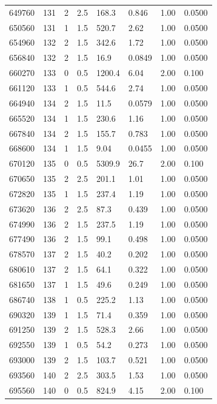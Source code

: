 \documentclass[preview]{standalone}
\begin{document}
{{{{{{{{{{\begin{tabular}{L{1.2cm}C{1.2cm} C{0.3cm}C{0.5cm} C{1.4cm}C{1.4cm} C{1.4cm}C{1.4cm}}
  649760  &   131  & 2     & 2.5 &  168.3  & 0.846  & 1.00 &  0.0500   \\ 
  650560  &   131  & 1     & 1.5 &  520.7  & 2.62  & 1.00 &  0.0500   \\ 
  654960  &   132  & 2     & 1.5 &  342.6  & 1.72  & 1.00 &  0.0500   \\ 
  656840  &   132  & 2     & 1.5 &  16.9  & 0.0849  & 1.00 &  0.0500   \\ 
  660270  &   133  & 0     & 0.5 &  1200.4  & 6.04  & 2.00 &  0.100   \\ 
  661120  &   133  & 1     & 0.5 &  544.6  & 2.74  & 1.00 &  0.0500   \\ 
  664940  &   134  & 2     & 1.5 &  11.5  & 0.0579  & 1.00 &  0.0500   \\ 
  665520  &   134  & 1     & 1.5 &  230.6  & 1.16  & 1.00 &  0.0500   \\ 
  667840  &   134  & 2     & 1.5 &  155.7  & 0.783  & 1.00 &  0.0500   \\ 
  668600  &   134  & 1     & 1.5 &  9.04  & 0.0455  & 1.00 &  0.0500   \\ 
  670120  &   135  & 0     & 0.5 &  5309.9  & 26.7  & 2.00 &  0.100   \\ 
  670650  &   135  & 2     & 2.5 &  201.1  & 1.01  & 1.00 &  0.0500   \\ 
  672820  &   135  & 1     & 1.5 &  237.4  & 1.19  & 1.00 &  0.0500   \\ 
  673620  &   136  & 2     & 2.5 &  87.3  & 0.439  & 1.00 &  0.0500   \\ 
  674990  &   136  & 2     & 1.5 &  237.5  & 1.19  & 1.00 &  0.0500   \\ 
  677490  &   136  & 2     & 1.5 &  99.1  & 0.498  & 1.00 &  0.0500   \\ 
  678570  &   137  & 2     & 1.5 &  40.2  & 0.202  & 1.00 &  0.0500   \\ 
  680610  &   137  & 2     & 1.5 &  64.1  & 0.322  & 1.00 &  0.0500   \\ 
  681650  &   137  & 1     & 1.5 &  49.6  & 0.249  & 1.00 &  0.0500   \\ 
  686740  &   138  & 1     & 0.5 &  225.2  & 1.13  & 1.00 &  0.0500   \\ 
  690320  &   139  & 1     & 1.5 &  71.4  & 0.359  & 1.00 &  0.0500   \\ 
  691250  &   139  & 2     & 1.5 &  528.3  & 2.66  & 1.00 &  0.0500   \\ 
  692550  &   139  & 1     & 0.5 &  54.2  & 0.273  & 1.00 &  0.0500   \\ 
  693000  &   139  & 2     & 1.5 &  103.7  & 0.521  & 1.00 &  0.0500   \\ 
  693560  &   140  & 2     & 2.5 &  303.5  & 1.53  & 1.00 &  0.0500   \\ 
  695560  &   140  & 0     & 0.5 &  824.9  & 4.15  & 2.00 &  0.100   \\ 
\hline 
\end{tabular} 

}}}}}}}}}}
\end{document}
